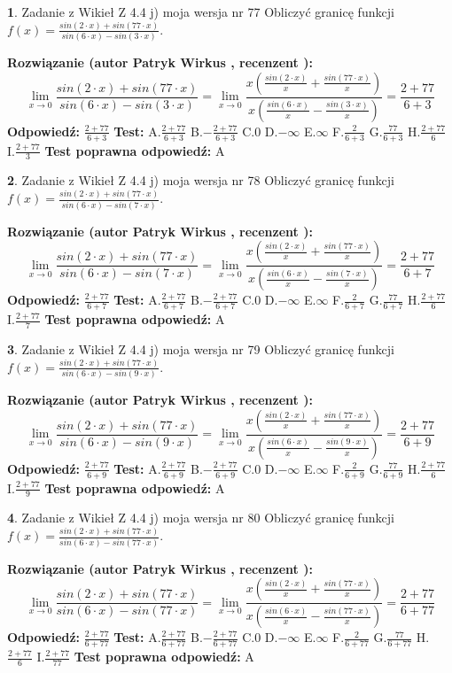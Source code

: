 \documentclass[12pt, a4paper]{article}
\theoremstyle{definition} %
\newtheorem{zad}{}
\newcommand{\zadStart}[1]{\begin{zad}#1\newline}
\newcommand{\zadStop}{\end{zad}}
\newcommand{\rozwStart}[2]{\noindent \textbf{Rozwiązanie (autor #1 , recenzent #2): }\newline}
\newcommand{\rozwStop}{\newline}
\newcommand{\odpStart}{\noindent \textbf{Odpowiedź:}\newline}
\newcommand{\odpStop}{\newline}
\newcommand{\testStart}{\noindent \textbf{Test:}\newline}
\newcommand{\testStop}{\newline}
\newcommand{\kluczStart}{\noindent \textbf{Test poprawna odpowiedź:}\newline}
\newcommand{\kluczStop}{\newline}
\begin{document}
\zadStart{Zadanie z Wikieł Z 4.4 j) moja wersja nr 77}
Obliczyć granicę funkcji $f(x)=\frac{sin(2\cdot x) +sin(77\cdot x)}{sin(6\cdot x) -sin(3\cdot x)}$.
\zadStop
\rozwStart{Patryk Wirkus}{}
$$\lim\limits_{x\to 0}\frac{sin(2\cdot x) +sin(77\cdot x)}{sin(6\cdot x) -sin(3\cdot x)}=\lim\limits_{x\to 0}\frac{x(\frac{sin(2\cdot x)}{x}+\frac{sin(77\cdot x)}{x})}{x(\frac{sin(6\cdot x)}{x}-\frac{sin(3\cdot x)}{x})}=\frac{2+77}{6+3}$$
\rozwStop
\odpStart
$\frac{2+77}{6+3}$
\odpStop
\testStart
A.$\frac{2+77}{6+3}$
B.$-\frac{2+77}{6+3}$
C.$0$
D.$-\infty$
E.$\infty$
F.$\frac{2}{6+3}$
G.$\frac{77}{6+3}$
H.$\frac{2+77}{6}$
I.$\frac{2+77}{3}$
\testStop
\kluczStart
A
\kluczStop



\zadStart{Zadanie z Wikieł Z 4.4 j) moja wersja nr 78}
Obliczyć granicę funkcji $f(x)=\frac{sin(2\cdot x) +sin(77\cdot x)}{sin(6\cdot x) -sin(7\cdot x)}$.
\zadStop
\rozwStart{Patryk Wirkus}{}
$$\lim\limits_{x\to 0}\frac{sin(2\cdot x) +sin(77\cdot x)}{sin(6\cdot x) -sin(7\cdot x)}=\lim\limits_{x\to 0}\frac{x(\frac{sin(2\cdot x)}{x}+\frac{sin(77\cdot x)}{x})}{x(\frac{sin(6\cdot x)}{x}-\frac{sin(7\cdot x)}{x})}=\frac{2+77}{6+7}$$
\rozwStop
\odpStart
$\frac{2+77}{6+7}$
\odpStop
\testStart
A.$\frac{2+77}{6+7}$
B.$-\frac{2+77}{6+7}$
C.$0$
D.$-\infty$
E.$\infty$
F.$\frac{2}{6+7}$
G.$\frac{77}{6+7}$
H.$\frac{2+77}{6}$
I.$\frac{2+77}{7}$
\testStop
\kluczStart
A
\kluczStop



\zadStart{Zadanie z Wikieł Z 4.4 j) moja wersja nr 79}
Obliczyć granicę funkcji $f(x)=\frac{sin(2\cdot x) +sin(77\cdot x)}{sin(6\cdot x) -sin(9\cdot x)}$.
\zadStop
\rozwStart{Patryk Wirkus}{}
$$\lim\limits_{x\to 0}\frac{sin(2\cdot x) +sin(77\cdot x)}{sin(6\cdot x) -sin(9\cdot x)}=\lim\limits_{x\to 0}\frac{x(\frac{sin(2\cdot x)}{x}+\frac{sin(77\cdot x)}{x})}{x(\frac{sin(6\cdot x)}{x}-\frac{sin(9\cdot x)}{x})}=\frac{2+77}{6+9}$$
\rozwStop
\odpStart
$\frac{2+77}{6+9}$
\odpStop
\testStart
A.$\frac{2+77}{6+9}$
B.$-\frac{2+77}{6+9}$
C.$0$
D.$-\infty$
E.$\infty$
F.$\frac{2}{6+9}$
G.$\frac{77}{6+9}$
H.$\frac{2+77}{6}$
I.$\frac{2+77}{9}$
\testStop
\kluczStart
A
\kluczStop



\zadStart{Zadanie z Wikieł Z 4.4 j) moja wersja nr 80}
Obliczyć granicę funkcji $f(x)=\frac{sin(2\cdot x) +sin(77\cdot x)}{sin(6\cdot x) -sin(77\cdot x)}$.
\zadStop
\rozwStart{Patryk Wirkus}{}
$$\lim\limits_{x\to 0}\frac{sin(2\cdot x) +sin(77\cdot x)}{sin(6\cdot x) -sin(77\cdot x)}=\lim\limits_{x\to 0}\frac{x(\frac{sin(2\cdot x)}{x}+\frac{sin(77\cdot x)}{x})}{x(\frac{sin(6\cdot x)}{x}-\frac{sin(77\cdot x)}{x})}=\frac{2+77}{6+77}$$
\rozwStop
\odpStart
$\frac{2+77}{6+77}$
\odpStop
\testStart
A.$\frac{2+77}{6+77}$
B.$-\frac{2+77}{6+77}$
C.$0$
D.$-\infty$
E.$\infty$
F.$\frac{2}{6+77}$
G.$\frac{77}{6+77}$
H.$\frac{2+77}{6}$
I.$\frac{2+77}{77}$
\testStop
\kluczStart
A
\kluczStop
\end{document}
